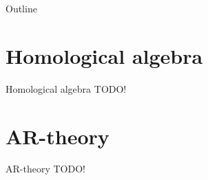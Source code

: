 \newcommand{\QPAIntroPartNumber}{3}




\begin{frame}
  \titlepage
\end{frame}

\begin{frame}{Outline}
  \tableofcontents
\end{frame}

\section{Homological algebra}

\begin{frame}{Homological algebra}
TODO!
\end{frame}


\section{AR-theory}

\begin{frame}{AR-theory}
TODO!
\end{frame}



